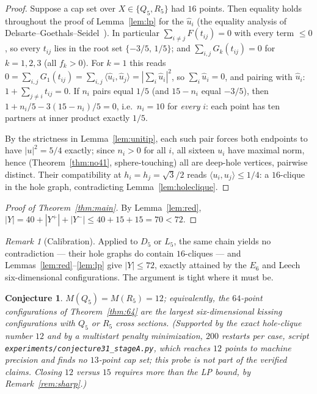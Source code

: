 \documentclass[11pt]{article}
\newtheorem{conjecture}[theorem]{Conjecture}
\theoremstyle{remark}
\newtheorem{remark}[theorem]{Remark}
\newcommand{\ip}[2]{\langle #1,#2\rangle}
\begin{document}
\begin{proof}
Suppose a cap set over $X\in\{Q_5,R_5\}$ had $16$ points. Then
equality holds throughout the proof of Lemma~\ref{lem:lp} for the
$\hat u_i$ (the equality analysis of
Delsarte--Goethals--Seidel~\cite{DGS1977}). In particular $\sum_{i\ne j}F(t_{ij})=0$ with every term
$\le 0$, so every $t_{ij}$ lies in the root set $\{-3/5,\,1/5\}$; and
$\sum_{i,j}G_k(t_{ij})=0$ for $k=1,2,3$ (all $f_k>0$). For $k=1$
this reads
$0=\sum_{i,j}G_1(t_{ij})=\sum_{i,j}\ip{\hat u_i}{\hat u_j}
=|\sum_i\hat u_i|^2$, so $\sum_i\hat u_i=0$, and pairing with
$\hat u_i$:
$1+\sum_{j\ne i}t_{ij}=0$. If $n_i$ pairs equal $1/5$ (and $15-n_i$
equal $-3/5$), then $1+n_i/5-3(15-n_i)/5=0$, i.e.\ $n_i=10$ for
\emph{every} $i$: each point has ten partners at inner product exactly
$1/5$.

By the strictness in Lemma~\ref{lem:unitip}, each such pair forces both
endpoints to have $|u|^2=5/4$ exactly; since $n_i>0$ for all $i$, all
sixteen $u_i$ have maximal norm, hence (Theorem~\ref{thm:no41},
sphere-touching) all are deep-hole vertices, pairwise distinct. Their
compatibility at $h_i=h_j=\sqrt3/2$ reads $\ip{u_i}{u_j}\le 1/4$: a
$16$-clique in the hole graph, contradicting
Lemma~\ref{lem:holeclique}.
\end{proof}

\begin{proof}[Proof of Theorem~\ref{thm:main}]
By Lemma~\ref{lem:red},
$|Y| = 40 + |Y^+| + |Y^-| \le 40 + 15 + 15 = 70 < 72$.
\end{proof}

\begin{remark}[Calibration]
Applied to $D_5$ or $L_5$, the same chain yields no contradiction ---
their hole graphs do contain $16$-cliques --- and
Lemmas~\ref{lem:red}--\ref{lem:lp} give $|Y|\le 72$, exactly attained
by the $E_6$ and Leech six-dimensional configurations. The argument is
tight where it must be.
\end{remark}

\begin{conjecture}
$M(Q_5)=M(R_5)=12$; equivalently, the $64$-point configurations of
Theorem~\ref{thm:64} are the largest six-dimensional kissing
configurations with $Q_5$ or $R_5$ cross sections. (Supported by the
exact hole-clique number $12$ and by a multistart penalty minimization,
$200$ restarts per case, script
\texttt{experiments/conjecture31\_stageA.py}, which reaches $12$ points to
machine precision and finds no $13$-point cap set; this probe is not part
of the verified claims. Closing $12$ versus $15$ requires more than the LP
bound, by Remark~\ref{rem:sharp}.)
\end{conjecture}
\end{document}
